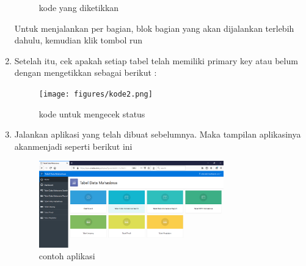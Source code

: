 \begin{enumerate}
\begin{figure}[H]
				\centering
				\caption{kode yang diketikkan}
				\end{figure}
	Untuk menjalankan per bagian, blok bagian yang akan dijalankan terlebih dahulu, kemudian klik tombol run
	\item Setelah itu, cek apakah setiap tabel telah memiliki primary key atau belum dengan mengetikkan sebagai berikut :\\
                \begin{figure}[H]
				\texttt{[image: figures/kode2.png]}
				\centering
				\caption{kode untuk mengecek status}
				\end{figure}
	\item Jalankan aplikasi yang telah dibuat sebelumnya. Maka tampilan aplikasinya akanmenjadi seperti berikut ini
				\begin{figure}[H]
				\includegraphics[width=8cm]{figures/aplikasi.png}
				\centering
				\caption{contoh aplikasi}
				\end{figure}
\end{enumerate}
